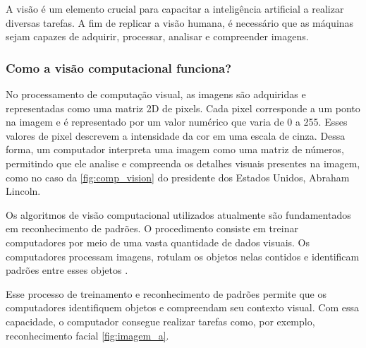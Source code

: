 
A visão é um elemento crucial para capacitar a inteligência artificial a realizar diversas tarefas. A fim de replicar a visão humana, é necessário que as máquinas sejam capazes de adquirir, processar, analisar e compreender imagens. \cite{como_funciona_visao_computacional}




\subsubsection{Como a visão computacional funciona?}
No processamento de computação visual, as imagens são adquiridas e representadas como uma matriz 2D de pixels. Cada pixel corresponde a um ponto na imagem e é representado por um valor numérico que varia de 0 a 255. Esses valores de pixel descrevem a intensidade da cor em uma escala de cinza. Dessa forma, um computador interpreta uma imagem como uma matriz de números, permitindo que ele analise e compreenda os detalhes visuais presentes na imagem, como no caso da \cref{fig:comp_vision} do presidente dos Estados Unidos, Abraham Lincoln\cite{mit_video}.

Os algoritmos de visão computacional utilizados atualmente são fundamentados em reconhecimento de padrões. O procedimento consiste em treinar computadores por meio de uma vasta quantidade de dados visuais. Os computadores processam imagens, rotulam os objetos nelas contidos e identificam padrões entre esses objetos \cite{content_Human_Vision}.

Esse processo de treinamento e reconhecimento de padrões permite que os computadores identifiquem objetos e compreendam seu contexto visual. Com essa capacidade, o computador consegue realizar tarefas como, por exemplo, reconhecimento facial \cref{fig:imagem_a}.

